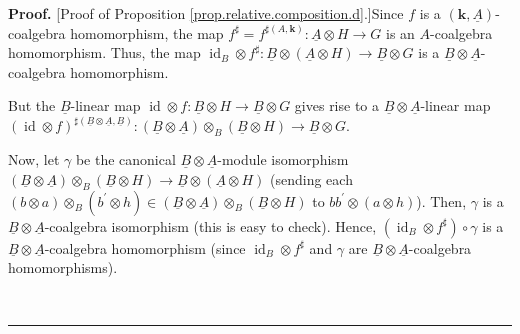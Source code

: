 \documentclass
[numbers=enddot,12pt,final,onecolumn,notitlepage,abstracton]{scrartcl}%
\theoremstyle{definition}
\newenvironment{proof}[1][Proof]{\noindent\textbf{#1.} }{\ \rule{0.5em}{0.5em}}
\begin{document}
\begin{proof}
[Proof of Proposition \ref{prop.relative.composition.d}.]Since $f$ is a
$\left(  \mathbf{k},\underline{A}\right)  $-coalgebra homomorphism, the map
$f^{\sharp}=f^{\sharp\left(  A,\mathbf{k}\right)  }:\underline{A}\otimes
H\rightarrow G$ is an $A$-coalgebra homomorphism. Thus, the map
$\operatorname*{id}\nolimits_{B}\otimes f^{\sharp}:\underline{B}\otimes\left(
\underline{A}\otimes H\right)  \rightarrow\underline{B}\otimes G$ is a
$\underline{B}\otimes\underline{A}$-coalgebra homomorphism.

But the $\underline{B}$-linear map $\operatorname*{id}\otimes f:\underline{B}%
\otimes H\rightarrow\underline{B}\otimes G$ gives rise to a $\underline{B}%
\otimes\underline{A}$-linear map $\left(  \operatorname*{id}\otimes f\right)
^{\sharp\left(  \underline{B}\otimes\underline{A},\underline{B}\right)
}:\left(  \underline{B}\otimes\underline{A}\right)  \otimes_{B}\left(
\underline{B}\otimes H\right)  \rightarrow\underline{B}\otimes G$.

Now, let $\gamma$ be the canonical $\underline{B}\otimes\underline{A}$-module
isomorphism $\left(
\underline{B}\otimes\underline{A}\right)  \otimes_{B}\left(  \underline{B}%
\otimes H\right)  \rightarrow\underline{B}\otimes\left(  \underline{A}\otimes
H\right)  $ (sending each $\left(  b\otimes a\right)  \otimes_{B}\left(
b^{\prime}\otimes h\right)  \in\left(  \underline{B}\otimes\underline{A}%
\right)  \otimes_{B}\left(  \underline{B}\otimes H\right)  $ to $bb^{\prime
}\otimes\left(  a\otimes h\right)  $). Then, $\gamma$ is a $\underline{B}%
\otimes\underline{A}$-coalgebra isomorphism (this is easy to check). Hence,
$\left(  \operatorname*{id}\nolimits_{B}\otimes f^{\sharp}\right)  \circ
\gamma$ is a $\underline{B}\otimes\underline{A}$-coalgebra homomorphism (since
$\operatorname*{id}\nolimits_{B}\otimes f^{\sharp}$ and $\gamma$ are
$\underline{B}\otimes\underline{A}$-coalgebra homomorphisms).


\end{proof}
\end{document}
